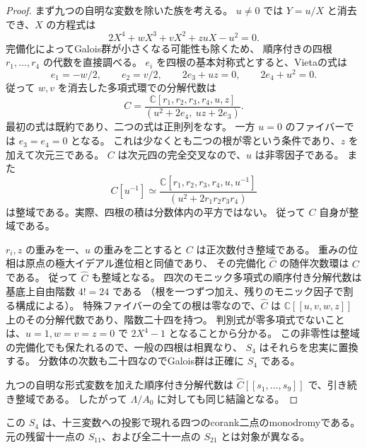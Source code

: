 \begin{proof}
まず九つの自明な変数を除いた族を考える。
$u\ne0$ では $Y=u/X$ と消去でき、$X$ の方程式は
\[
 2X^4+wX^3+vX^2+zuX-u^2=0.
 \label{eq:four-quartic-v23}
\]
完備化によってGalois群が小さくなる可能性も除くため、
順序付きの四根 $r_1,\ldots,r_4$ の代数を直接調べる。
$e_i$ を四根の基本対称式とすると、Vietaの式は
\[
 e_1=-w/2,\qquad e_2=v/2,\qquad
 2e_3+uz=0,\qquad 2e_4+u^2=0.
\]
従って $w,v$ を消去した多項式環での分解代数は
\[
 C=\frac{\mathbb C[r_1,r_2,r_3,r_4,u,z]}
 {(u^2+2e_4,\ uz+2e_3)}.
\]
最初の式は既約であり、二つの式は正則列をなす。
一方 $u=0$ のファイバーでは $e_3=e_4=0$ となる。
これは少なくとも二つの根が零という条件であり、$z$ を加えて次元三である。
$C$ は次元四の完全交叉なので、$u$ は非零因子である。
また
\[
 C[u^{-1}]
 \simeq
 \frac{\mathbb C[r_1,r_2,r_3,r_4,u,u^{-1}]}
 {(u^2+2r_1r_2r_3r_4)}
\]
は整域である。実際、四根の積は分数体内の平方ではない。
従って $C$ 自身が整域である。

$r_i,z$ の重みを一、$u$ の重みを二とすると $C$ は正次数付き整域である。
重みの位相は原点の極大イデアル進位相と同値であり、
その完備化 $\widehat C$ の随伴次数環は $C$ である。
従って $\widehat C$ も整域となる。
四次のモニック多項式の順序付き分解代数は基底上自由階数 $4!=24$ である
（根を一つずつ加え、残りのモニック因子で割る構成による）。
特殊ファイバーの全ての根は零なので、$\widehat C$ は
$\mathbb C[[u,v,w,z]]$ 上のその分解代数であり、階数二十四を持つ。
判別式が零多項式でないことは、$u=1,w=v=z=0$ で $2X^4-1$ となることから分かる。
この非零性は整域の完備化でも保たれるので、一般の四根は相異なり、
$S_4$ はそれらを忠実に置換する。
分数体の次数も二十四なのでGalois群は正確に $S_4$ である。

九つの自明な形式変数を加えた順序付き分解代数は
$\widehat C[[s_1,\ldots,s_9]]$ で、引き続き整域である。
したがって $\Lambda/A_0$ に対しても同じ結論となる。
\end{proof}

この $S_4$ は、十三変数への投影で現れる四つのcorank二点のmonodromyである。
元の残留十一点の $S_{11}$、および全二十一点の $S_{21}$ とは対象が異なる。
